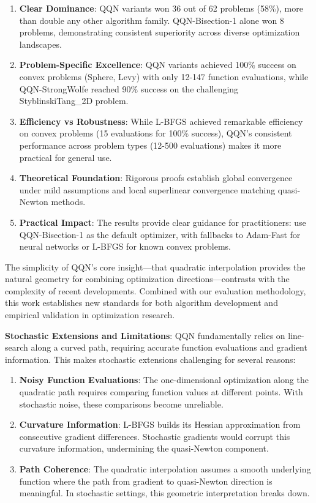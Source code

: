 \begin{enumerate}
\def\labelenumi{\arabic{enumi}.}
\item
  \textbf{Clear Dominance}: QQN variants won 36 out of 62 problems (58\%), more than double any other algorithm family. QQN-Bisection-1 alone won 8 problems, demonstrating consistent superiority across diverse optimization landscapes.
\item
  \textbf{Problem-Specific Excellence}: QQN variants achieved 100\% success on convex problems (Sphere, Levy) with only 12-147 function evaluations, while QQN-StrongWolfe reached 90\% success on the challenging StyblinskiTang\_2D problem.
\item
  \textbf{Efficiency vs Robustness}: While L-BFGS achieved remarkable efficiency on convex problems (15 evaluations for 100\% success), QQN's consistent performance across problem types (12-500 evaluations) makes it more practical for general use.
\item
  \textbf{Theoretical Foundation}: Rigorous proofs establish global convergence under mild assumptions and local superlinear convergence matching quasi-Newton methods.
\item
  \textbf{Practical Impact}: The results provide clear guidance for practitioners: use QQN-Bisection-1 as the default optimizer, with fallbacks to Adam-Fast for neural networks or L-BFGS for known convex problems.
\end{enumerate}

The simplicity of QQN's core insight---that quadratic interpolation provides the natural geometry for combining optimization directions---contrasts with the complexity of recent developments.
Combined with our evaluation methodology, this work establishes new standards for both algorithm development and empirical validation in optimization research.

\textbf{Stochastic Extensions and Limitations}: QQN fundamentally relies on line-search along a curved path, requiring accurate function evaluations and gradient information. This makes stochastic extensions challenging for several reasons:

\begin{enumerate}
\def\labelenumi{\arabic{enumi}.}
\item
  \textbf{Noisy Function Evaluations}: The one-dimensional optimization along the quadratic path requires comparing function values at different points.
  With stochastic noise, these comparisons become unreliable.
\item
  \textbf{Curvature Information}: L-BFGS builds its Hessian approximation from consecutive gradient differences.
  Stochastic gradients would corrupt this curvature information, undermining the quasi-Newton component.
\item
  \textbf{Path Coherence}: The quadratic interpolation assumes a smooth underlying function where the path from gradient to quasi-Newton direction is meaningful.
  In stochastic settings, this geometric interpretation breaks down.
\end{enumerate}

